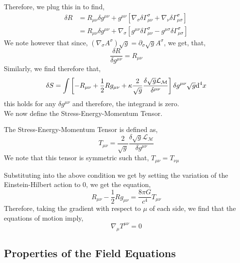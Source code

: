 \documentclass[11pt, a4paper]{article}
\begin{document}
Therefore, we plug this in to find, 
\begin{align*}\delta R& = R_{\mu \nu} \delta g^{\mu\nu} + g^{\mu\nu}\left[\nabla_\sigma \delta \Gamma^\sigma_{\mu\nu} + \nabla_\nu \delta \Gamma^\sigma _{\mu\sigma}\right]
\\
& = R_{\mu\nu}\delta g^{\mu\nu} + \nabla_\sigma \left[g^{\mu\nu}\delta \Gamma^\sigma_{\mu\nu} - g^{\mu\sigma}\delta \Gamma^\sigma_{\mu\sigma}\right]
\end{align*}
We note however that since, $\left(\nabla_\sigma A^\sigma \right)\sqrt{g} = \partial_\sigma \sqrt{g} A^\sigma$, we get, that, 
\[\frac{\delta R}{\delta g^{\mu\nu}} = R_{\mu\nu}\]
Similarly, we find therefore that, 
\[\delta S = \int\left[-R_{\mu\nu} + \frac{1}{2} Rg_{\mu\nu} + \kappa \frac{2}{\sqrt{g}} \frac{\delta \sqrt{g}\mathcal{L_M}}{\delta^{\mu\nu} }\right] \delta g^{\mu\nu} \sqrt{g}\mathrm{d}^4 x\]
this holds for any $\delta g^{\mu\nu}$ and therefore, the integrand is zero.
\\
We now define the Stress-Energy-Momentum Tensor. 
\begin{definition}
The Stress-Energy-Momentum Tensor is defined as, 
\[T_{\mu\nu} = \frac{2}{\sqrt{g}} \frac{\delta\sqrt{g}\mathcal{L_M}}{\delta g^{\mu\nu}}\]
We note that this tensor is symmetric such that, $T_{\mu\nu} = T_{\nu\mu}$
\end{definition}
Substituting into the above condition we get by setting the variation of the Einstein-Hilbert action to 0, we get the equation, 
\[R_{\mu\nu} -\frac{1}{2}R g_{\mu\nu} = \frac{8\pi G}{c^4}T_{\mu\nu}\]
Therefore, taking the gradient  with respect to $\mu$ of each side, we find that the equations of motion imply, 
\[\nabla_\mu T^{\mu\nu} = 0\]

\subsection{Properties of the Field Equations}
\end{document}
